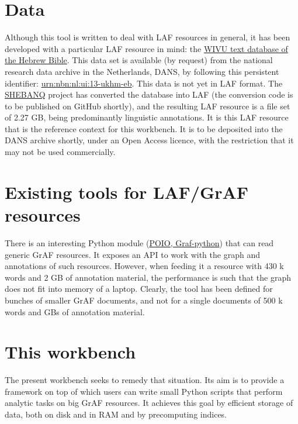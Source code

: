 \documentclass[letterpaper,10pt,english]{sphinxmanual}
\begin{document}
\section{Data}
\label{overview:id2}\label{overview:data}
Although this tool is written to deal with LAF resources in general, it has been developed with a particular
LAF resource in mind:
the \href{http://www.dans.knaw.nl/en/content/categorieen/projecten/text-database-hebrew-old-testament}{WIVU text database of the Hebrew Bible}.
This data set is available (by request) from the national research data archive in the Netherlands, DANS,
by following this persistent identifier:
\href{http://www.persistent-identifier.nl/?identifier=urn\%3Anbn\%3Anl\%3Aui\%3A13-ukhm-eb}{urn:nbn:nl:ui:13-ukhm-eb}.
This data is not yet in LAF format.
The \href{http://www.slideshare.net/dirkroorda/shebanq-gniezno}{SHEBANQ} project has
converted the database into LAF (the conversion code is to be published on GitHub shortly),
and the resulting LAF resource is a file set of 2.27 GB, being predominantly linguistic annotations.
It is this LAF resource that is the reference context for this workbench.
It is to be deposited into the DANS archive shortly, under an Open Access licence, with the
restriction that it may not be used commercially.


\section{Existing tools for LAF/GrAF resources}
\label{overview:existing-tools-for-laf-graf-resources}
There is an interesting Python module (\href{http://media.cidles.eu/poio/graf-python/}{POIO, Graf-python})
that can read generic GrAF resources.
It exposes an API to work with the graph and annotations of such resources.
However, when feeding it a resource with 430 k words and 2 GB of annotation material,
the performance is such that the graph does not fit into memory of a laptop.
Clearly, the tool has been defined for bunches of smaller GrAF documents,
and not for a single documents of 500 k words and GBs of annotation material.


\section{This workbench}
\label{overview:this-workbench}
The present workbench seeks to remedy that situation.
Its aim is to provide a framework on top of which users can write small Python scripts that
perform analytic tasks on big GrAF resources.
It achieves this goal by efficient storage of data, both on disk and in RAM and by precomputing indices.
\end{document}

